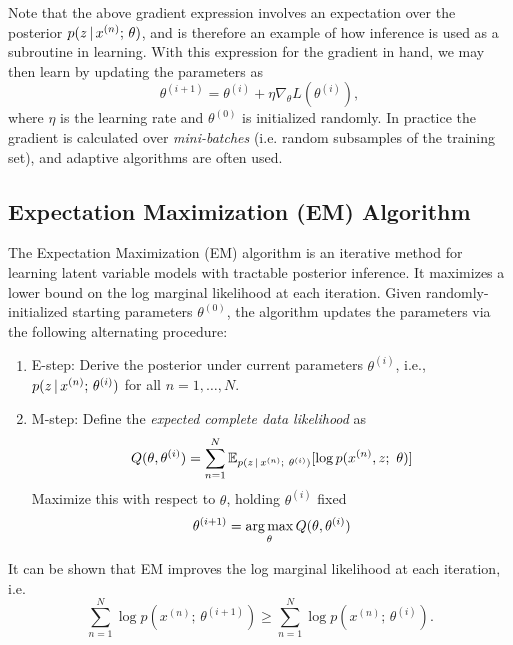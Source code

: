 \documentclass{article}
\begin{document}
Note that the above gradient expression involves an expectation over the posterior $p(z \,|\, x^{(n)} ; \, \theta)$, and is therefore an example of how inference is used as a subroutine in learning. With this expression for the gradient in hand, we may then learn by updating the parameters as
\[ \theta^{(i+1)} = \theta^{(i)} + \eta \nabla_\theta L(\theta^{(i)}),\]
where $\eta$ is the learning rate and $\theta^{(0)}$ is initialized randomly. In practice the gradient
is calculated over \textit{mini-batches} (i.e. random subsamples of the training set), and adaptive algorithms \citep{duchi2011,zeiler2012,Kingma2015} are often used.

\subsection{Expectation Maximization (EM) Algorithm}\label{em}
The Expectation Maximization (EM) algorithm \citep{dempster77em} is an iterative method for learning latent variable models with tractable posterior inference.  It maximizes a lower bound on the log marginal likelihood at each iteration.
Given randomly-initialized starting parameters $\theta^{(0)}$, the algorithm updates the parameters via the following alternating procedure:
\begin{enumerate}
\item E-step: Derive the posterior under current parameters $\theta^{(i)}$, i.e., $p(z \,|\, x^{(n)} ; \, \theta^{(i)})$ for all $n = 1, \dots, N$.
\item M-step: Define the \emph{expected complete data likelihood} as 
\[ Q(\theta, \theta^{(i)}) = \sum_{n=1}^N \E_{p(z \given x^{(n)} ; \ \theta^{(i)})} [\log p(x^{(n)}, z ; \ \theta)] \]
Maximize this with respect to $\theta$, holding $\theta^{(i)}$ fixed
\[ \theta^{(i+1)} = \argmax_{\theta} Q(\theta, \theta^{(i)}) \]
\end{enumerate}
It can be shown that EM improves the log marginal likelihood at each iteration, i.e. 
\[\sum_{n=1}^N \log p(x^{(n)} ; \, \theta^{(i+1)}) \ge \sum_{n=1}^N \log p(x^{(n)} ; \, \theta^{(i)}). \]
\end{document}
